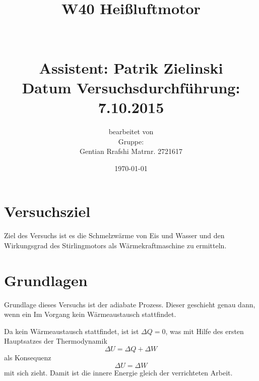 \documentclass[fontsize=12pt]{scrartcl}
\begin{document}
\begin{minipage}{0.9\textwidth}
\begin{center}\large
\title{W40 Heißluftmotor \\
		~\\
		~\\
		Assistent: Patrik Zielinski \\
		Datum Versuchsdurchführung: \\
		7.10.2015}

\author{bearbeitet von\\
		Gruppe: \\
		Gentian Rrafshi Matrnr. 2721617}
\date{\today}

\maketitle

\end{center}
\end{minipage}

\newpage

\tableofcontents

\newpage
\noindent

\section{ Versuchsziel}

Ziel des Versuchs ist es die Schmelzwärme von Eis und Wasser und den Wirkungsgrad des Stirlingmotors als Wärmekraftmaschine zu ermitteln.

\section{ Grundlagen}

Grundlage dieses Versuchs ist der adiabate Prozess. Dieser geschieht genau dann, wenn ein Im Vorgang kein Wärmeaustausch stattfindet. \par

Da kein Wärmeaustausch stattfindet, ist ist $\Delta Q =0$, was mit Hilfe des ersten Hauptsatzes der Thermodynamik
\begin{equation}
\Delta U = \Delta Q + \Delta W
\end{equation}
als Konsequenz 
\begin{equation}
\Delta U =  \Delta W
\end{equation}
mit sich zieht. Damit ist die innere Energie gleich der verrichteten Arbeit. \par
\end{document}
